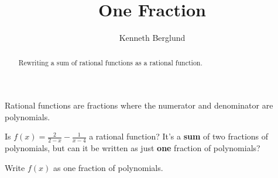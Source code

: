 \documentclass[noauthor,noinstructornotes]{ximera}
\title{One Fraction}
\author{Kenneth Berglund}
\begin{document}
\begin{abstract}
    Rewriting a sum of rational functions as a rational function.
\end{abstract}
\maketitle

Rational functions are fractions where the numerator and
denominator are polynomials.

Is \(f(x) = \frac{2}{2 - x} - \frac{1}{x - 4}\) a rational function?
It's a \textbf{sum} of two fractions of polynomials, but can it be
written as just \textbf{one} fraction of polynomials?

Write \(f(x)\) as one fraction of polynomials.
\end{document}
